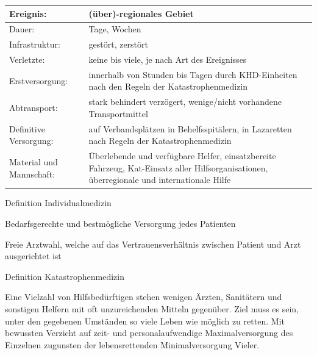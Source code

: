 \documentclass{article}
\begin{document}
\begin{center}
\begin{tabular}{|m{3.31cm}|m{9.99cm}|}
\hline
Ereignis:

 &
(\"uber)-regionales Gebiet

\\\hline
Dauer:

 &
Tage, Wochen

\\\hline
Infrastruktur:

 &
gest\"ort, zerst\"ort

\\\hline
Verletzte:

 &
keine bis viele, je nach Art des Ereignisses

\\\hline
Erstversorgung:

 &
innerhalb von Stunden bis Tagen durch KHD\footnotemark{}{}-Einheiten
nach den Regeln der Katastrophenmedizin

\\\hline
Abtransport:

 &
stark behindert verz\"ogert, wenige/nicht vorhandene Transportmittel

\\\hline
Definitive Versorgung:

 &
auf Verbandspl\"atzen in Behelfsspit\"alern, in Lazaretten nach Regeln
der Katastrophenmedizin

\\\hline
Material und Mannschaft:

 &
\"Uberlebende und verf\"ugbare Helfer, einsatzbereite Fahrzeug,
Kat-Einsatz aller Hilfsorganisationen, \"uberregionale und
internationale Hilfe

\\\hline
\end{tabular}
\end{center}
Definition Individualmedizin

Bedarfsgerechte und bestm\"ogliche Versorgung jedes Patienten 

Freie Arztwahl, welche auf das Vertrauensverh\"altnis zwischen Patient
und Arzt ausgerichtet ist

Definition Katastrophenmedizin

Eine Vielzahl von Hilfsbed\"urftigen stehen wenigen \"Arzten,
Sanit\"atern und sonstigen Helfern mit oft unzureichenden Mitteln
gegen\"uber. Ziel muss es sein, unter den gegebenen Umst\"anden so
viele Leben wie m\"oglich zu retten. Mit bewussten Verzicht auf zeit-
und personalaufwendige Maximalversorgung des Einzelnen zugunsten der
lebensrettenden Minimalversorgung Vieler.
\end{document}
